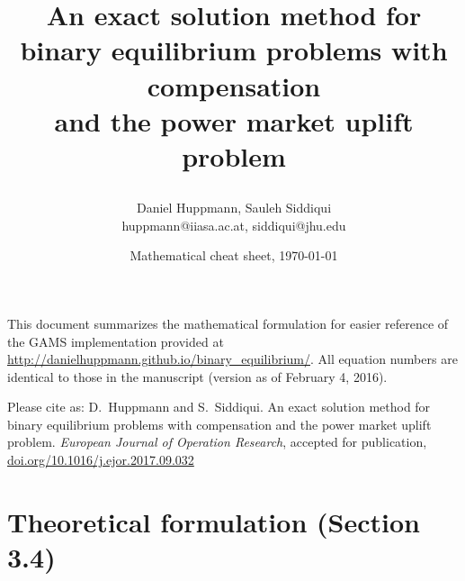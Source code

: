 \documentclass[9pt,a4paper]{article}
\title{\Large An exact solution method for \\ binary equilibrium problems with compensation \\ 
	and the power market uplift problem
\author{\normalsize Daniel Huppmann, Sauleh Siddiqui \\
	\small huppmann@iiasa.ac.at, siddiqui@jhu.edu
}
\date{\normalsize Mathematical cheat sheet, \today}
}
\begin{document}
\maketitle

This document summarizes the mathematical formulation for easier reference of the GAMS implementation provided at \url{http://danielhuppmann.github.io/binary_equilibrium/}. All equation numbers are identical to those in the manuscript (version as of February 4, 2016).

\vspace{4 pt} \noindent
Please cite as: 
\newline 
D.~Huppmann and S.~Siddiqui. 
An exact solution method for binary equilibrium problems with compensation
and the power market uplift problem. 
\newline
\emph{European Journal of Operation Research}, accepted for publication,
\newline
\href{https://dx.doi.org/10.1016/j.ejor.2017.09.032}{doi.org/10.1016/j.ejor.2017.09.032}

\section*{Theoretical formulation (Section 3.4)}
\end{document}
